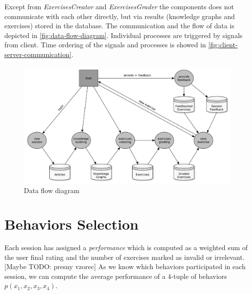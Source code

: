 \documentclass[a4paper, 12pt, twoside]{fithesis2}		%
\renewcommand{\_}{\leavevmode \kern0.07em\vbox{\hrule width0.4em}}
\begin{document}
Except from \textit{ExercisesCreator} and \textit{ExercisesGrader}
the components does not communicate with each other directly,
but via results (knowledge graphs and exercises) stored in the database.
The communication and the flow of data is depicted in \autoref{fig:data-flow-diagram}.
Individual processes are triggered by signals from client.
Time ordering of the signals and processes is showed in \autoref{fig:client-server-communication}.

\begin{figure}[h]
  \centering
  \includegraphics[width=\textwidth]{images/data-flow-diagram.pdf}
  \caption{Data flow diagram}
  \label{fig:data-flow-diagram}
\end{figure}

\section{Behaviors Selection}
\label{sec:smartoo-behaviors-selection}

Each session has assigned a \textit{performance} which is computed as a weighted sum of the user final rating and the number of exercises marked as invalid or irrelevant. [Maybe TODO: presny vzorec]
As we know which behaviors participated in each session, we can compute the average performance of a 4-tuple of behaviors $p(x_1, x_2, x_3, x_4)$.
\end{document}
